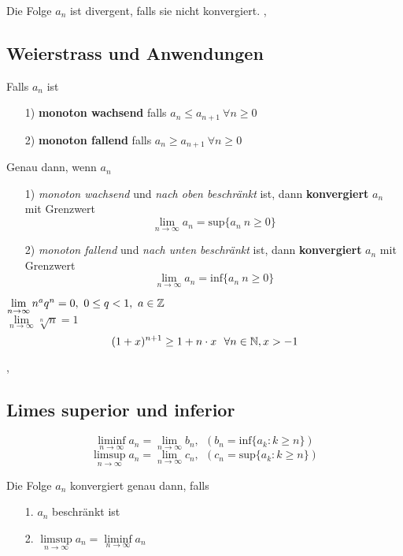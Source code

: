 Die Folge $a_{n}$ ist divergent, falls sie nicht konvergiert.
\sep

\subsection{Weierstrass und Anwendungen}

\Def[2.2.1] Falls  $a_{n}$ ist
\begin{enumerate}
\item[1)] \textbf{monoton wachsend}  falls ${a_{n} \leq a_{n + 1} \ \forall n \geq 0}$
\item[2)] \textbf{monoton fallend} falls ${a_{n} \geq a_{n + 1} \ \forall n \geq 0}$
\end{enumerate}

\Satz[2.2.2 (Weierstrass)] Genau dann, wenn $a_{n}$ 
\begin{enumerate}
\item[1)] \textit{monoton wachsend} und \textit{nach oben beschränkt} ist, dann \textbf{konvergiert} $a_{n}$ mit Grenzwert
\[ 
\lim\limits_{n \rightarrow \infty} a_{n} = \text{sup}\{a_{n} \: n \geq 0\}
\]
\item[2)] \textit{monoton fallend} und \textit{nach unten beschränkt} ist, dann \textbf{konvergiert} $a_{n}$ mit Grenzwert
\[ 
\lim\limits_{n \rightarrow \infty} a_{n} = \text{inf}\{a_{n} \: n \geq 0\}
\]
\end{enumerate}
\Bsp[2.2.3] $\lim\limits_{n \rightarrow \infty} n^{a}q^{n} = 0, \ 0 \leq q < 1, \ a \in \mathbb{Z}$ \\
\Bsp[2.2.5] $\lim\limits_{n \rightarrow \infty} \sqrt[n]{n} = 1$ \\
\[
(1 + x)^{n+1} \geq 1 + n \cdot x \ \ \forall n \in \N, x > -1
\] 

\sep

\subsection{Limes superior und inferior}

\Def[2.3.0]
\[
\liminf\limits_{n \rightarrow \infty} a_{n} = \lim\limits_{n \rightarrow \infty} b_{n}, \ \ (b_{n} = \text{inf} \{a_{k} : k \geq n \})
\]
\[
\limsup\limits_{n \rightarrow \infty} a_{n} = \lim\limits_{n \rightarrow \infty} c_{n}, \ \ (c_{n} = \text{sup} \{a_{k} : k \geq n \})
\]

\Lemma[2.4.1] Die Folge $a_{n}$ konvergiert genau dann, falls
\begin{enumerate}
\item[1.] $a_{n}$ beschränkt ist
\item[2.] $\limsup\limits_{n \rightarrow \infty} a_{n} = \liminf\limits_{n \rightarrow \infty} a_{n}$
\end{enumerate}

